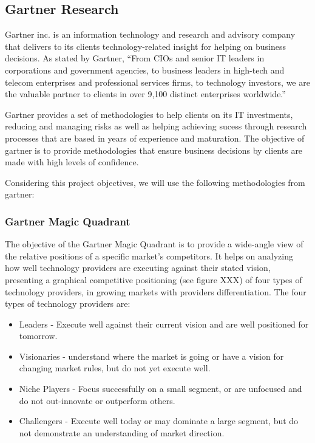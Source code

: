 \subsection{Gartner Research}

Gartner inc. is an information technology and research and advisory company that delivers to its clients technology-related insight for helping on business decisions. As stated by Gartner, ``From CIOs and senior IT leaders in corporations and government agencies, to business leaders in high-tech and telecom enterprises and professional services firms, to technology investors, we are the valuable partner to clients in over 9,100 distinct enterprises worldwide.''\par
Gartner provides a set of methodologies to help clients on its IT investments, reducing and managing risks as well as helping achieving sucess through research processes that are based in years of experience and maturation. The objective of gartner is to provide methodologies that ensure business decisions by clients are made with high levels of confidence.\par
Considering this project objectives, we will use the following methodologies from gartner:

\subsubsection{Gartner Magic Quadrant}

The objective of the Gartner Magic Quadrant is to provide a wide-angle view of the relative positions of a specific market's competitors. It helps on analyzing how well technology providers are executing against their stated vision, presenting a graphical competitive positioning (see figure XXX) of four types of technology providers, in growing markets with providers differentiation. The four types of technology providers are:

\begin{itemize}
\item Leaders - Execute well against their current vision and are well positioned for tomorrow.
\item Visionaries - understand where the market is going or have a vision for changing market rules, but do not yet execute well.
\item Niche Players - Focus successfully on a small segment, or are unfocused and do not out-innovate or outperform others.
\item Challengers - Execute well today or may dominate a large segment, but do not demonstrate an understanding of market direction.
\end{itemize}

